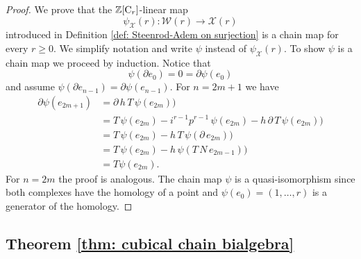 \begin{proof}
	We prove that the $\mathbb{Z}[\mathrm{C}_r]$-linear map
	\begin{equation*}
	\psi_{\mathcal X}(r) : \mathcal W(r) \to \mathcal X(r)
	\end{equation*}
	introduced in Definition \ref{def: Steenrod-Adem on surjection} is a chain map for every $r \geq 0$. We simplify notation and write $\psi$ instead of $\psi_{\mathcal X}(r)$. To show $\psi$ is a chain map we proceed by induction. Notice that
	\begin{equation*}
	\psi(\partial e_0) = 0 = \partial \psi(e_0)
	\end{equation*}
	and assume $\psi(\partial e_{n-1}) = \partial \psi(e_{n-1})$. For $n = 2m+1$ we have
	\begin{align*}
	\partial \psi(e_{2m+1}) 
	& =
	\partial\, h\, T\, \psi(e_{2m}) \big) \\
	& =
	T\, \psi(e_{2m}) - i^{r-1} p^{r-1}\, \psi(e_{2m}) -
	h\, \partial\, T\, \psi(e_{2m}) \big) \\
	& =
	T\, \psi(e_{2m}) - 
	h\, T\, \psi(\partial\, e_{2m}) \big) \\
	& =
	T\, \psi(e_{2m}) - 
	h\, \psi(T\,N\, e_{2m-1}) \big) \\
	& = 
	T \psi(e_{2m}).
	\end{align*}
	For $n = 2m$ the proof is analogous. The chain map $\psi$ is a quasi-isomorphism since both complexes have the homology of a point and $\psi(e_0) = (1, \dots, r)$ is a generator of the homology.
\end{proof}

\subsection{Theorem \ref{thm: cubical chain bialgebra}}

